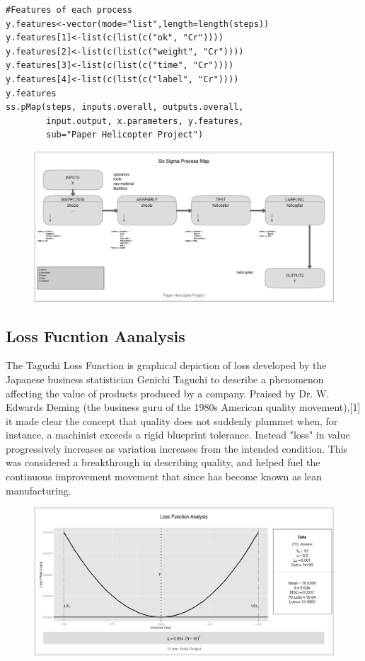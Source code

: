 \documentclass[]{article}
\begin{document}
\begin{framed}
\begin{verbatim}
#Features of each process
y.features<-vector(mode="list",length=length(steps))
y.features[1]<-list(c(list(c("ok", "Cr"))))
y.features[2]<-list(c(list(c("weight", "Cr"))))
y.features[3]<-list(c(list(c("time", "Cr"))))
y.features[4]<-list(c(list(c("label", "Cr"))))
y.features
ss.pMap(steps, inputs.overall, outputs.overall,
        input.output, x.parameters, y.features,
        sub="Paper Helicopter Project")
\end{verbatim}
\end{framed}
\begin{figure}[h!]
\centering
\includegraphics[width=0.9\linewidth]{./SixSigmaProcessMap}
\caption{}
\label{fig:SixSigmaProcessMap}
\end{figure}
\newpage
\subsection{Loss Fucntion Aanalysis}
The Taguchi Loss Function is graphical depiction of loss developed by the Japanese business statistician Genichi Taguchi to describe a phenomenon affecting the value of products produced by a company. Praised by Dr. W. Edwards Deming (the business guru of the 1980s American quality movement),[1] it made clear the concept that quality does not suddenly plummet when, for instance, a machinist exceeds a rigid blueprint tolerance. Instead "loss" in value progressively increases as variation increases from the intended condition. This was considered a breakthrough in describing quality, and helped fuel the continuous improvement movement that since has become known as lean manufacturing.

\begin{figure}[h!]
\centering
\includegraphics[width=0.7\linewidth]{./LossFunctionAnalysis}
\caption{}
\label{fig:LossFunctionAnalysis}
\end{figure}
\newpage
\end{document}
